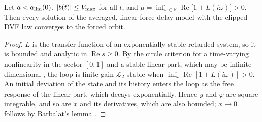 \begin{proposition}\label{prop:circle}
Let $a<a_{\lim}(0)$, $\lvert b(t)\rvert\le V_{\max}$ for all $t$, and $\mu=\inf_{\omega\in\mathbb R}\operatorname{Re}\bigl[1+L(i\omega)\bigr]>0$. Then every solution of the averaged, linear-force delay model with the clipped DVF law converges to the forced orbit.
\end{proposition}
\begin{proof}
$L$ is the transfer function of an exponentially stable retarded system, so it is bounded and analytic in $\operatorname{Re}s\ge0$. By the circle criterion for a time-varying nonlinearity in the sector $[0,1]$ and a stable linear part, which may be infinite-dimensional \citep{zames1966inputI,zames1966inputII,desoer1975feedback}, the loop is finite-gain $\mathcal L_2$-stable when $\inf_\omega\operatorname{Re}[1+L(i\omega)]>0$. An initial deviation of the state and its history enters the loop as the free response of the linear part, which decays exponentially. Hence $y$ and $\varphi$ are square integrable, and so are $\tilde x$ and its derivatives, which are also bounded; $\tilde x\to0$ follows by Barbalat's lemma \citep{khalil2002nonlinear}.
\end{proof}


